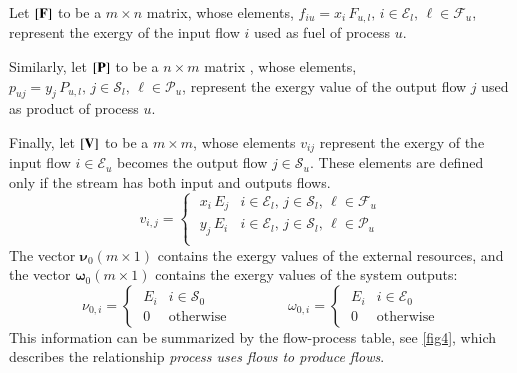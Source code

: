 \documentclass{ecos2018}
\begin{document}
Let  $\left[ \textbf{F} \right]$ to be a  $m \times n$ matrix, whose elements, $f_{iu}=x_i\,F_{u,l},\, i\in\mathcal{E}_l, \, \ell\in\mathcal{F}_u$, represent the exergy  of the input flow $i$ used as fuel of process $u$.

Similarly, let $\left[ \textbf{P} \right]$ to be a $n \times m$ matrix , whose elements, $p_{uj}=y_j\,P_{u,l},\, j\in\mathcal{S}_l, \, \ell\in\mathcal{P}_u$, represent the exergy value of the output flow $j$ used as product of process $u$.

Finally, let $\left[ \textbf{V} \right]$ to be a $m \times m$, whose elements $v_{ij}$ represent the exergy of the input flow $i\in\mathcal{E}_u$ becomes the output flow $j\in\mathcal{S}_u$. These elements are defined only if the stream has both input and outputs flows.
\begin{equation}
v_{i,j}=\begin{cases}
\;x_i\,E_j & i\in\mathcal{E}_l,\, j\in\mathcal{S}_l,\, \ell\in\mathcal{F}_u\\[1em]
\;y_j\,E_i & i\in\mathcal{E}_l,\, j\in\mathcal{S}_l,\, \ell\in\mathcal{P}_u\\
\end{cases}
\end{equation}
The vector $\bm{\nu}_0 (m \times 1)$ contains the exergy values of the external resources, and the vector $\bm{\omega}_0 (m \times 1)$ contains the exergy values of the system outputs:
\begin{equation}
\nu_{0,i}=\begin{cases}
\;E_i & i\in\mathcal{S}_0 \\
\;0   & \text{otherwise}
\end{cases}
\qquad\qquad
\omega_{0,i}=\begin{cases}
\;E_i & i\in\mathcal{E}_0 \\
\;0   & \text{otherwise}
\end{cases}
\end{equation}
This information can be summarized by the flow-process table, see \cref{fig4}, which describes the relationship \emph{process uses flows to produce flows}.
\end{document}
